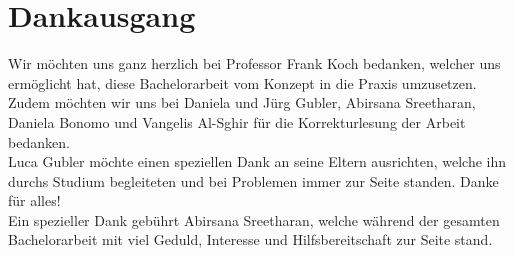 \section{Dankausgang}
Wir möchten uns ganz herzlich bei Professor Frank Koch bedanken, welcher uns ermöglicht hat, diese Bachelorarbeit vom Konzept in die Praxis umzusetzen. \\

Zudem möchten wir uns bei Daniela und Jürg Gubler, Abirsana Sreetharan, Daniela Bonomo und Vangelis Al-Sghir für die Korrekturlesung der Arbeit bedanken. \\


Luca Gubler möchte einen speziellen Dank an seine Eltern ausrichten, welche ihn durchs Studium begleiteten und bei Problemen immer zur Seite standen. Danke für alles!\\
Ein spezieller Dank gebührt Abirsana Sreetharan, welche während der gesamten Bachelorarbeit mit viel Geduld, Interesse und Hilfsbereitschaft zur Seite stand.
